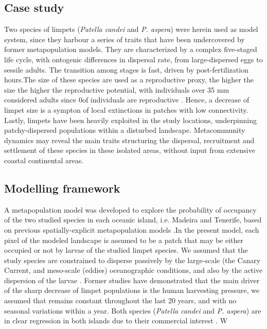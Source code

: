\documentclass[12pt]{article}
\begin{document}
\begin{flushleft}
{{{{{\subsection{Case study}
Two species of limpets (\textit{Patella candei} and \textit{P. aspera}) were herein used as model system, since they harbour a series of traits that have been undercovered by former metapopulation models. They are characterized by a complex five-staged life cycle, with ontogenic differences in dispersal rate, from large-dispersed eggs to sessile adults. The transition among stages is fast, driven by post-fertilization hours.The size of these species are used as a reproductive proxy, the higher the size the higher the reproductive potential, with individuals over 35 mm considered adults since 0\percent of individuals are reproductive \citep{henriques2012life}. Hence, a decrease of limpet size is a sympton of local extinctions in patches with low connectivity. Lastly, limpets have been heavily exploited in the study locations, underpinning patchy-dispersed populations within a disturbed landscape. Metacommunity dynamics may reveal the main traits structuring the dispersal, recruitment and settlement of these species in these isolated areas, without input from extensive coastal continental areas.

\subsection{Modelling framework}
A metapopulation model was developed to explore the probability of occupancy of the two studied species in each oceanic island, i.e. Madeira and Tenerife, based on previous spatially-explicit metapopulation models \citep{hanski1999habitat,hanski2000metapopulation, ovaskainen2001spatially, hanski2002extinction, bertuzzo2015metapopulation}.In the present model, each pixel of the modeled landscape is assumed to be a patch that may be either occupied or not by larvae of the studied limpet species. We assumed that the study species are constrained to disperse passively by the large-scale (the Canary Current, \citep{barton1998transition} and meso-scale (eddies) oceanographic conditions, and also by the active dispersion of the larvae \citep{henriques2012life}. Former studies have demonstrated that the main driver of the sharp decrease of limpet populations is the human harvesting pressure, we assumed that remains constant throughout the last 20 years, and with no seasonal variations within a year. Both species (\textit{Patella candei} and \textit{P. aspera}) are in clear regression in both islands due to their commercial interest \citep{riera2016clear, sousa2019long}. W

}}}}}
\end{flushleft}
\end{document}
